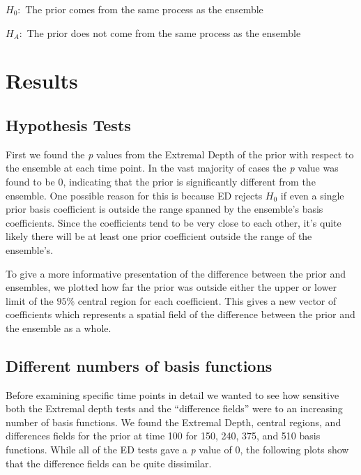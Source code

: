 \documentclass[12pt]{article}
\begin{document}
\begin{center}
$ H_0:$ The prior comes from the same process as the ensemble

$ H_A:$ The prior does not come from the same process as the ensemble
\end{center}

\section{Results}

\subsection{Hypothesis Tests}
First we found the  \textit{p} values from the Extremal Depth of the prior with respect to the ensemble at each time point. In the vast majority of cases the \textit{p} value was found to be 0, indicating that the prior is significantly different from the ensemble. One possible reason for this is because ED rejects $H_0$ if even a single prior basis coefficient is outside the range spanned by the ensemble's basis coefficients. Since the coefficients tend to be very close to each other, it's quite likely there will be at least one prior coefficient outside the range of the ensemble's.

To give a more informative presentation of the difference between the prior and ensembles, we plotted how far the prior was outside either the upper or lower limit of the $95\%$ central region for each coefficient. This gives a new vector of coefficients which represents a spatial field of the difference between the prior and the ensemble as a whole.

\subsection{Different numbers of basis functions}
Before examining specific time points in detail we wanted to see how sensitive both the Extremal depth tests and the ``difference fields'' were to an increasing number of basis functions. We found the Extremal Depth, central regions, and differences fields for the prior at time 100 for 150, 240, 375, and 510 basis functions. While all of the ED tests gave a \textit{p}  value of 0, the following plots show that the difference fields can be quite dissimilar.
\end{document}
